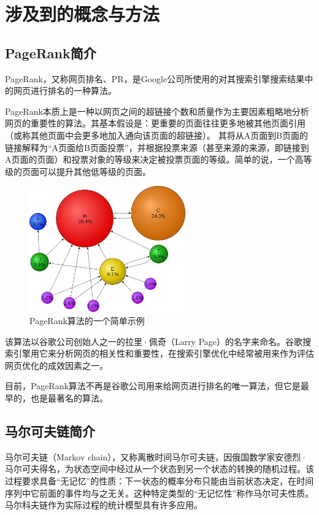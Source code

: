 \documentclass[UTF8,openany]{ctexbook}
\begin{document}
\section[涉及到的概念与方法]{涉及到的概念与方法}
\subsection[PageRank简介]{PageRank简介}
PageRank，又称网页排名、PR，是Google公司所使用的对其搜索引擎搜索结果中的网页进行排名的一种算法。

PageRank本质上是一种以网页之间的超链接个数和质量作为主要因素粗略地分析网页的重要性的算法。其基本假设是：更重要的页面往往更多地被其他页面引用（或称其他页面中会更多地加入通向该页面的超链接）。 其将从A页面到B页面的链接解释为“A页面给B页面投票”，并根据投票来源（甚至来源的来源，即链接到A页面的页面）和投票对象的等级来决定被投票页面的等级。简单的说，一个高等级的页面可以提升其他低等级的页面。

\begin{figure}[H]
    \begin{center}
        \includegraphics[width=0.6\textwidth]{images/PageRanks-Example.svg.png}
        \caption{PageRank算法的一个简单示例}
    \end{center}
\end{figure}

该算法以谷歌公司创始人之一的拉里·佩奇（Larry Page）的名字来命名。谷歌搜索引擎用它来分析网页的相关性和重要性，在搜索引擎优化中经常被用来作为评估网页优化的成效因素之一。

目前，PageRank算法不再是谷歌公司用来给网页进行排名的唯一算法，但它是最早的，也是最著名的算法。



\subsection[马尔可夫链简介]{马尔可夫链简介}
马尔可夫链（Markov chain），又称离散时间马尔可夫链，因俄国数学家安德烈·马尔可夫得名，为状态空间中经过从一个状态到另一个状态的转换的随机过程。该过程要求具备“无记忆”的性质：下一状态的概率分布只能由当前状态决定，在时间序列中它前面的事件均与之无关。这种特定类型的“无记忆性”称作马尔可夫性质。马尔科夫链作为实际过程的统计模型具有许多应用。
\end{document}
